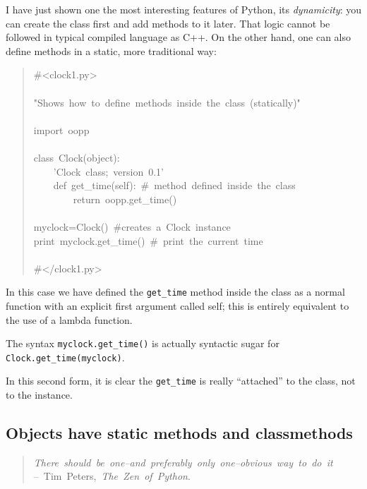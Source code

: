 \documentclass[10pt,english]{article}
\begin{document}
I have just shown one the most interesting features of Python, its
\emph{dynamicity}: you can create the class first and add methods to it later.
That logic cannot be followed in typical compiled language as C++. On the
other hand, one can also define methods in a static, more traditional way:
\begin{quote}
\begin{ttfamily}\begin{flushleft}
\mbox{{\#}<clock1.py>}\\
\mbox{}\\
\mbox{"Shows~how~to~define~methods~inside~the~class~(statically)"}\\
\mbox{}\\
\mbox{import~oopp}\\
\mbox{}\\
\mbox{class~Clock(object):}\\
\mbox{~~~~'Clock~class;~version~0.1'}\\
\mbox{~~~~def~get{\_}time(self):~{\#}~method~defined~inside~the~class}\\
\mbox{~~~~~~~~return~oopp.get{\_}time()}\\
\mbox{}\\
\mbox{myclock=Clock()~{\#}creates~a~Clock~instance}\\
\mbox{print~myclock.get{\_}time()~{\#}~print~the~current~time}\\
\mbox{}\\
\mbox{{\#}</clock1.py>}
\end{flushleft}\end{ttfamily}
\end{quote}

In this case we have defined the \texttt{get{\_}time} method inside the class as a
normal function with an explicit first argument called self; this is
entirely equivalent to the use of a lambda function.

The syntax \texttt{myclock.get{\_}time()} is actually syntactic sugar for
\texttt{Clock.get{\_}time(myclock)}.

In this second form, it is clear the \texttt{get{\_}time} is really ``attached'' to the
class, not to the instance.



\hypertarget{objects-have-static-methods-and-classmethods}{}
\subsection*{Objects have static methods and classmethods}
\begin{quote}
\begin{flushleft}
\emph{There~should~be~one--and~preferably~only~one--obvious~way~to~do~it}~\\
--~Tim~Peters,~\emph{The~Zen~of~Python}.
\end{flushleft}
\end{quote}
\end{document}
